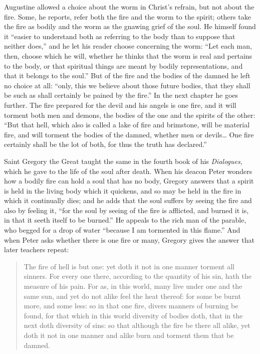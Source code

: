 Augustine allowed a choice about the worm in Christ's refrain, but not about the fire. Some, he reports, refer both the fire and the worm to the spirit; others take the fire as bodily and the worm as the gnawing grief of the soul. He himself found it ``easier to understand both as referring to the body than to suppose that neither does,'' and he let his reader choose concerning the worm: ``Let each man, then, choose which he will, whether he thinks that the worm is real and pertains to the body, or that spiritual things are meant by bodily representations, and that it belongs to the soul.'' But of the fire and the bodies of the damned he left no choice at all: ``only, this we believe about those future bodies, that they shall be such as shall certainly be pained by the fire.'' In the next chapter he goes further. The fire prepared for the devil and his angels is one fire, and it will torment both men and demons, the bodies of the one and the spirits of the other: ``But that hell, which also is called a lake of fire and brimstone, will be material fire, and will torment the bodies of the damned, whether men or devils\ldots{} One fire certainly shall be the lot of both, for thus the truth has declared.''

Saint Gregory the Great taught the same in the fourth book of his \emph{Dialogues}, which he gave to the life of the soul after death. When his deacon Peter wonders how a bodily fire can hold a soul that has no body, Gregory answers that a spirit is held in the living body which it quickens, and so may be held in the fire in which it continually dies; and he adds that the soul suffers by seeing the fire and also by feeling it, ``for the soul by seeing of the fire is afflicted, and burned it is, in that it seeth itself to be burned.'' He appeals to the rich man of the parable, who begged for a drop of water ``because I am tormented in this flame.'' And when Peter asks whether there is one fire or many, Gregory gives the answer that later teachers repeat:

\begin{quote}
The fire of hell is but one: yet doth it not in one manner torment all sinners. For every one there, according to the quantity of his sin, hath the measure of his pain. For as, in this world, many live under one and the same sun, and yet do not alike feel the heat thereof: for some be burnt more, and some less: so in that one fire, divers manners of burning be found, for that which in this world diversity of bodies doth, that in the next doth diversity of sins: so that although the fire be there all alike, yet doth it not in one manner and alike burn and torment them that be damned.
\end{quote}

